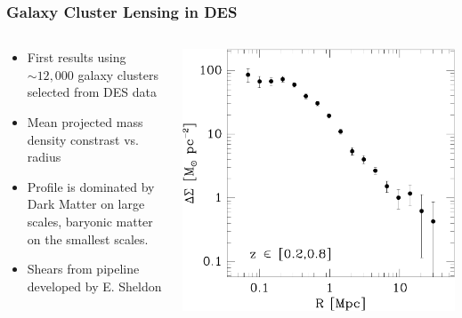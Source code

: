 \documentclass{beamer}
\begin{document}
\frame
{

    \frametitle{Galaxy Cluster Lensing in DES}

    \fontsize{9}{0.8\baselineskip}

    \begin{columns}

        \begin{column}{0.5\textwidth}

            \begin{itemize}

                \item First results using $\sim 12,000$ galaxy clusters
                    selected from DES data

                \item Mean projected mass density constrast vs. radius

                \item Profile is dominated by Dark Matter on large scales,
                    baryonic matter on the smallest scales.

                \item Shears from pipeline developed by E. Sheldon

            \end{itemize}

        \end{column}

        \begin{column}{0.5\textwidth}
            \includegraphics[scale=0.3]{run-rm008-bin-zwide-jack.pdf}
        \end{column}

    \end{columns}

}
\end{document}
